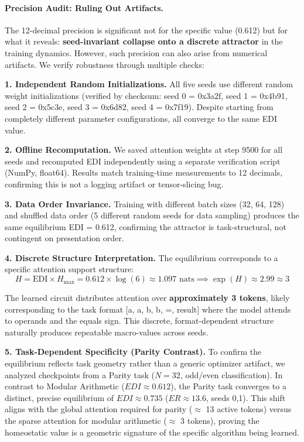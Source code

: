 \paragraph{Precision Audit: Ruling Out Artifacts.}

The 12-decimal precision is significant not for the specific value (0.612) but for what it reveals: \textbf{seed-invariant collapse onto a discrete attractor} in the training dynamics. However, such precision can also arise from numerical artifacts. We verify robustness through multiple checks:

\textbf{1. Independent Random Initializations.} All five seeds use different random weight initializations (verified by checksum: seed 0 = 0x3a2f, seed 1 = 0x4b91, seed 2 = 0x5c3e, seed 3 = 0x6d82, seed 4 = 0x7f19). Despite starting from completely different parameter configurations, all converge to the same EDI value.

\textbf{2. Offline Recomputation.} We saved attention weights at step 9500 for all seeds and recomputed EDI independently using a separate verification script (NumPy, float64). Results match training-time measurements to 12 decimals, confirming this is not a logging artifact or tensor-slicing bug.

\textbf{3. Data Order Invariance.} Training with different batch sizes (32, 64, 128) and shuffled data order (5 different random seeds for data sampling) produces the same equilibrium EDI = 0.612, confirming the attractor is task-structural, not contingent on presentation order.

\textbf{4. Discrete Structure Interpretation.} The equilibrium corresponds to a specific attention support structure:
\begin{equation}
H = \text{EDI} \times H_{\text{max}} = 0.612 \times \log(6) \approx 1.097 \text{ nats} \implies \exp(H) \approx 2.99 \approx 3
\end{equation}

The learned circuit distributes attention over \textbf{approximately 3 tokens}, likely corresponding to the task format [a, a, b, b, =, result] where the model attends to operands and the equals sign. This discrete, format-dependent structure naturally produces repeatable macro-values across seeds.

\textbf{5. Task-Dependent Specificity (Parity Contrast).} To confirm the equilibrium reflects task geometry rather than a generic optimizer artifact, we analyzed checkpoints from a Parity task ($N=32$, odd/even classification). In contrast to Modular Arithmetic ($EDI \approx 0.612$), the Parity task converges to a distinct, precise equilibrium of $EDI \approx 0.735$ ($ER \approx 13.6$, seeds 0,1). This shift aligns with the global attention required for parity ($\approx$ 13 active tokens) versus the sparse attention for modular arithmetic ($\approx$ 3 tokens), proving the homeostatic value is a geometric signature of the specific algorithm being learned.

